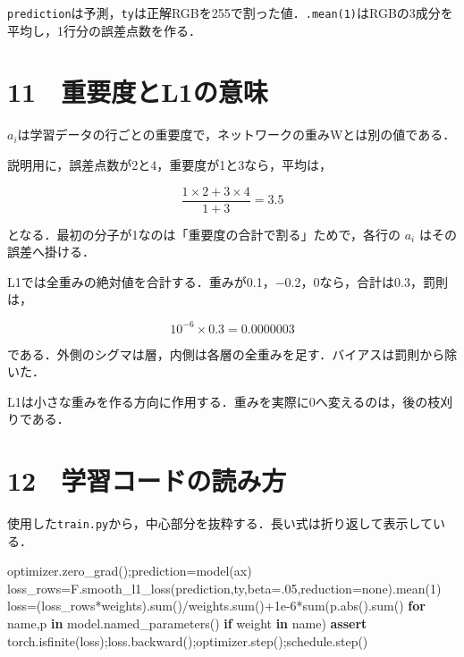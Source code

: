 \documentclass[
  14pt,
  a5paper,
]{extarticle}
\newenvironment{Shaded}{}{}
\newcommand{\BuiltInTok}[1]{\textcolor[rgb]{0.00,0.50,0.00}{#1}}
\newcommand{\ControlFlowTok}[1]{\textcolor[rgb]{0.00,0.44,0.13}{\textbf{#1}}}
\newcommand{\DecValTok}[1]{\textcolor[rgb]{0.25,0.63,0.44}{#1}}
\newcommand{\FloatTok}[1]{\textcolor[rgb]{0.25,0.63,0.44}{#1}}
\newcommand{\KeywordTok}[1]{\textcolor[rgb]{0.00,0.44,0.13}{\textbf{#1}}}
\newcommand{\NormalTok}[1]{#1}
\newcommand{\OperatorTok}[1]{\textcolor[rgb]{0.40,0.40,0.40}{#1}}
\newcommand{\StringTok}[1]{\textcolor[rgb]{0.25,0.44,0.63}{#1}}
\begin{document}
\texttt{prediction}は予測，\texttt{ty}は正解RGBを255で割った値．\texttt{.mean(1)}はRGBの3成分を平均し，1行分の誤差点数を作る．

\newpage

\section{11　重要度とL1の意味}\label{ux91cdux8981ux5ea6ux3068l1ux306eux610fux5473}

\(a_i\)は学習データの行ごとの重要度で，ネットワークの重みWとは別の値である．

説明用に，誤差点数が2と4，重要度が1と3なら，平均は，

\[\frac{1\times2+3\times4}{1+3}=3.5\]

となる．最初の分子が1なのは「重要度の合計で割る」ためで，各行の \(a_i\)
はその誤差へ掛ける．

L1では全重みの絶対値を合計する．重みが0.1，−0.2，0なら，合計は0.3，罰則は，

\[10^{-6}\times0.3=0.0000003\]

である．外側のシグマは層，内側は各層の全重みを足す．バイアスは罰則から除いた．

L1は小さな重みを作る方向に作用する．重みを実際に0へ変えるのは，後の枝刈りである．

\newpage

\section{12　学習コードの読み方}\label{ux5b66ux7fd2ux30b3ux30fcux30c9ux306eux8aadux307fux65b9}

使用した\texttt{train.py}から，中心部分を抜粋する．長い式は折り返して表示している．

\begin{Shaded}
\begin{Highlighting}[]
\NormalTok{optimizer.zero\_grad()}\OperatorTok{;}\NormalTok{prediction}\OperatorTok{=}\NormalTok{model(ax)}
\NormalTok{loss\_rows}\OperatorTok{=}\NormalTok{F.smooth\_l1\_loss(prediction,ty,beta}\OperatorTok{=}\FloatTok{.05}\NormalTok{,reduction}\OperatorTok{=}\StringTok{\textquotesingle{}none\textquotesingle{}}\NormalTok{).mean(}\DecValTok{1}\NormalTok{)}
\NormalTok{loss}\OperatorTok{=}\NormalTok{(loss\_rows}\OperatorTok{*}\NormalTok{weights).}\BuiltInTok{sum}\NormalTok{()}\OperatorTok{/}\NormalTok{weights.}\BuiltInTok{sum}\NormalTok{()}\OperatorTok{+}\FloatTok{1e{-}6}\OperatorTok{*}\BuiltInTok{sum}\NormalTok{(p.}\BuiltInTok{abs}\NormalTok{().}\BuiltInTok{sum}\NormalTok{() }\ControlFlowTok{for}\NormalTok{ name,p }\KeywordTok{in}\NormalTok{ model.named\_parameters() }\ControlFlowTok{if} \StringTok{\textquotesingle{}weight\textquotesingle{}} \KeywordTok{in}\NormalTok{ name)}
\ControlFlowTok{assert}\NormalTok{ torch.isfinite(loss)}\OperatorTok{;}\NormalTok{loss.backward()}\OperatorTok{;}\NormalTok{optimizer.step()}\OperatorTok{;}\NormalTok{schedule.step()}
\end{Highlighting}
\end{Shaded}
\end{document}
